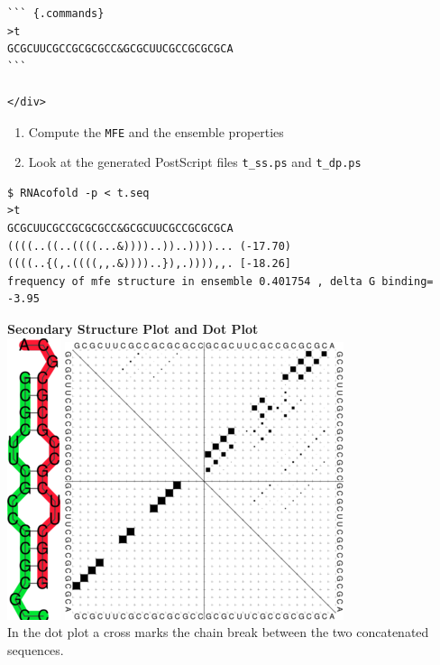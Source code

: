 \documentclass[]{article}
\providecommand{\tightlist}{%
  \setlength{\itemsep}{0pt}\setlength{\parskip}{0pt}}
\begin{document}
\begin{verbatim}
``` {.commands}
>t
GCGCUUCGCCGCGCGCC&GCGCUUCGCCGCGCGCA
```

</div>
\end{verbatim}

\begin{enumerate}
\def\labelenumi{\arabic{enumi}.}
\setcounter{enumi}{1}
\tightlist
\item
  Compute the \texttt{MFE} and the ensemble properties
\item
  Look at the generated PostScript files \texttt{t\_ss.ps} and
  \texttt{t\_dp.ps}
\end{enumerate}

\begin{verbatim}
$ RNAcofold -p < t.seq
>t
GCGCUUCGCCGCGCGCC&GCGCUUCGCCGCGCGCA
((((..((..((((...&))))..))..))))... (-17.70)
((((..{(,.((((,,.&))))..}),.)))),,. [-18.26]
frequency of mfe structure in ensemble 0.401754 , delta G binding= -3.95
\end{verbatim}

\textbf{Secondary Structure Plot and Dot Plot}\\
 \includegraphics{Figs/t_ss.png}
\includegraphics{Figs/t_dp.png}\\
In the dot plot a cross marks the chain break between the two
concatenated sequences.
\end{document}
